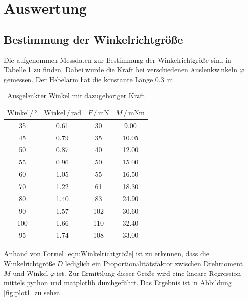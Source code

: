 \section{Auswertung}
\label{sec:Auswertung}

\subsection{Bestimmung der Winkelrichtgröße}

Die aufgenommen Messdaten zur Bestimmung der Winkelrichtgröße sind in Tabelle \ref{tab:Messdaten1}
zu finden. Dabei wurde die Kraft bei verschiedenen Auslenkwinkeln $\varphi$ gemessen. Der Hebelarm
hat die konstante Länge \SI{0.3}{\meter}.

\begin{table}
\centering
\caption{Ausgelenkter Winkel mit dazugehöriger Kraft}
\label{tab:Messdaten1}
\begin{tabular}{c c c c}
\toprule
$\text{Winkel} \,/\, °$ & $\text{Winkel} \,/\, \text{rad}$ & $F \,/\, \si{\milli\newton}$ & $M \,/\, \si{\milli\newton\meter}$\\
\midrule
 35 & 0.61 &  30 &  9.00\\
 45 & 0.79 &  35 & 10.05\\
 50 & 0.87 &  40 & 12.00\\
 55 & 0.96 &  50 & 15.00\\
 60 & 1.05 &  55 & 16.50\\
 70 & 1.22 &  61 & 18.30\\
 80 & 1.40 &  83 & 24.90\\
 90 & 1.57 & 102 & 30.60\\
100 & 1.66 & 110 & 32.40\\
 95 & 1.74 & 108 & 33.00\\
\bottomrule
\end{tabular}
\end{table}

Anhand von Formel \eqref{eqn:Winkelrichtgröße} ist zu erkennen, dass die Winkelrichtgröße $D$ 
lediglich ein Proportionalitätsfaktor zwischen Drehmoment $M$ und Winkel $\varphi$ ist. Zur Ermittlung 
dieser Größe wird eine lineare Regression mittels python und matplotlib durchgeführt. 
Das Ergebnis ist in Abbildung \ref{fig:plot1} zu sehen. 


